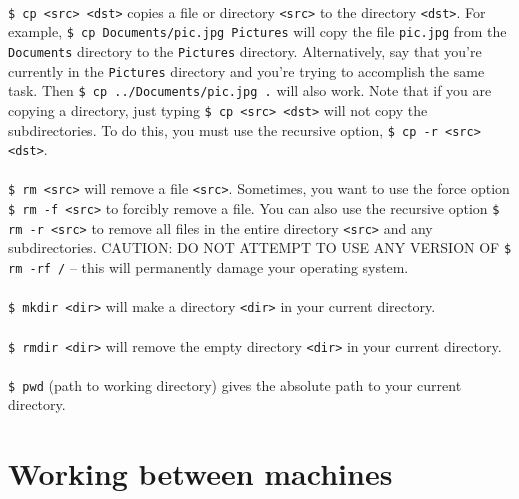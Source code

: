 \documentclass{article}
\begin{document}
\paragraph{} \texttt{\$ cp <src> <dst>} copies a file or directory \texttt{<src>} to the directory \texttt{<dst>}. For example, \texttt{\$ cp Documents/pic.jpg Pictures} will copy the file \texttt{pic.jpg} from the \texttt{Documents} directory to the \texttt{Pictures} directory. Alternatively, say that you're currently in the \texttt{Pictures} directory and you're trying to accomplish the same task. Then \texttt{\$ cp ../Documents/pic.jpg .} will also work. Note that if you are copying a directory, just typing \texttt{\$ cp <src> <dst>} will not copy the subdirectories. To do this, you must use the recursive option, \texttt{\$ cp -r <src> <dst>}.

\paragraph{} \texttt{\$ rm <src>} will remove a file \texttt{<src>}. Sometimes, you want to use the force option \texttt{\$ rm -f <src>} to forcibly remove a file. You can also use the recursive option \texttt{\$ rm -r <src>} to remove all files in the entire directory \texttt{<src>} and any subdirectories. CAUTION: DO NOT ATTEMPT TO USE ANY VERSION OF \texttt{\$ rm -rf /} -- this will permanently damage your operating system.

\paragraph{} \texttt{\$ mkdir <dir>} will make a directory \texttt{<dir>} in your current directory.

\paragraph{} \texttt{\$ rmdir <dir>} will remove the empty directory \texttt{<dir>} in your current directory.

\paragraph{} \texttt{\$ pwd} (path to working directory) gives the absolute path to your current directory.

\section{Working between machines}
\end{document}

